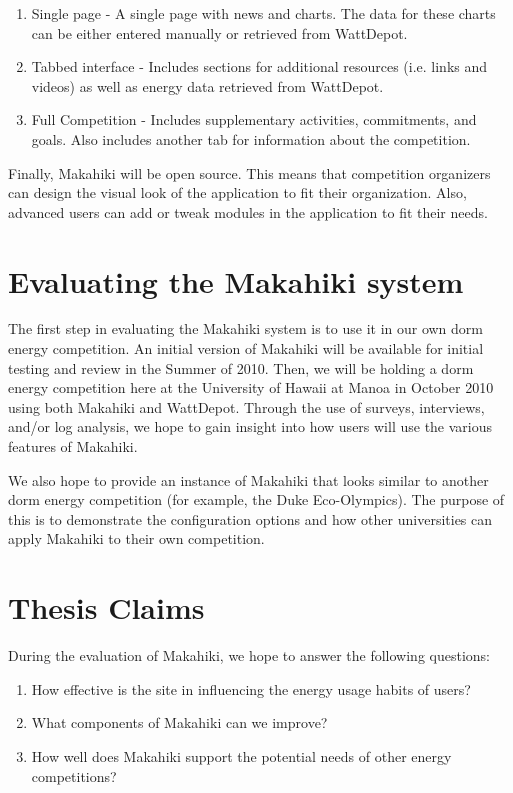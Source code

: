 \begin{enumerate}
	\item Single page - A single page with news and charts.  The data for these charts can be either entered manually or retrieved from WattDepot.
	\item Tabbed interface - Includes sections for additional resources (i.e. links and videos) as well as energy data retrieved from WattDepot.
	\item Full Competition - Includes supplementary activities, commitments, and goals.  Also includes another tab for information about the competition.
\end{enumerate}

Finally, Makahiki will be open source.  This means that competition organizers can design the visual look of the application to fit their organization.  Also, advanced users can add or tweak modules in the application to fit their needs.

\section{Evaluating the Makahiki system}

The first step in evaluating the Makahiki system is to use it in our own dorm energy competition.  An initial version of Makahiki will be available for initial testing and review in the Summer of 2010.  Then, we will be holding a dorm energy competition here at the University of Hawaii at Manoa in October 2010 using both Makahiki and WattDepot.  Through the use of surveys, interviews, and/or log analysis, we hope to gain insight into how users will use the various features of Makahiki.

We also hope to provide an instance of Makahiki that looks similar to another dorm energy competition (for example, the Duke Eco-Olympics).  The purpose of this is to demonstrate the configuration options and how other universities can apply Makahiki to their own competition.

\section{Thesis Claims}

During the evaluation of Makahiki, we hope to answer the following questions:

\begin{enumerate}
	\item How effective is the site in influencing the energy usage habits of users?
	\item What components of Makahiki can we improve?
	\item How well does Makahiki support the potential needs of other energy competitions?
\end{enumerate}

